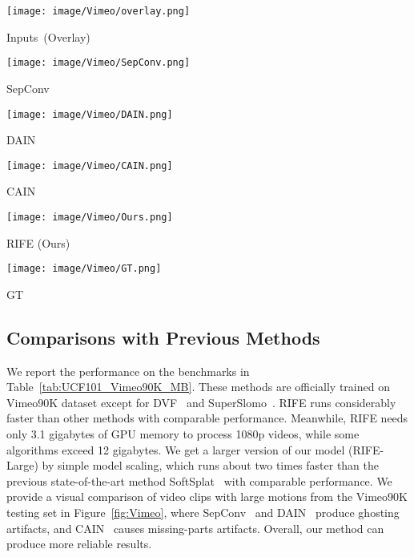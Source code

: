 \documentclass[10pt,twocolumn,letterpaper]{article}
\begin{document}
\begin{figure*}[htbp]
  \centering
  \begin{minipage}[t]{0.162\linewidth}
  \centering
  \texttt{[image: image/Vimeo/overlay.png]}
  \centerline{Inputs~(Overlay)}
  \end{minipage}
  \begin{minipage}[t]{0.162\linewidth}
  \centering
  \texttt{[image: image/Vimeo/SepConv.png]}
  \centerline{SepConv}
  \end{minipage}
\begin{minipage}[t]{0.162\linewidth}
  \centering
  \texttt{[image: image/Vimeo/DAIN.png]}
  \centerline{DAIN}
  \end{minipage}
  \begin{minipage}[t]{0.162\linewidth}
  \centering
  \texttt{[image: image/Vimeo/CAIN.png]}
  \centerline{CAIN}
  \end{minipage}
  \begin{minipage}[t]{0.162\textwidth}
  \centering
  \texttt{[image: image/Vimeo/Ours.png]}
  \centerline{RIFE (Ours)}
  \end{minipage}
  \begin{minipage}[t]{0.162\textwidth}
  \centering
  \texttt{[image: image/Vimeo/GT.png]}
  \centerline{GT}
  \end{minipage}
  \caption{\textbf{Qualitative comparison on Vimeo90K~\cite{xue2019video} testing set}. We cut out the objects according to the green boxes and zoom in the results~\cite{choi2020channel}. While other methods cause various artifacts, our method produces best effects on the moving objects.}
\label{fig:Vimeo}
\vspace{-1em}
\end{figure*} 
\subsection{Comparisons with Previous Methods}
\label{sec:comparison}


We report the performance on the benchmarks in Table~\ref{tab:UCF101_Vimeo90K_MB}. These methods are officially trained on Vimeo90K dataset except for DVF~\cite{liu2017video} and SuperSlomo~\cite{jiang2018super}. RIFE runs considerably faster than other methods with comparable performance. Meanwhile, RIFE needs only 3.1 gigabytes of GPU memory to process 1080p videos, while some algorithms exceed 12 gigabytes. We get a larger version of our model (RIFE-Large) by simple model scaling, which runs about two times faster than the previous state-of-the-art method SoftSplat~\cite{niklaus2020softmax} with comparable performance. We provide a visual comparison of video clips with large motions from the Vimeo90K testing set in Figure~\ref{fig:Vimeo}, where SepConv~\cite{Niklaus_ICCV_2017} and DAIN~\cite{bao2019depth} produce ghosting artifacts, and CAIN~\cite{choi2020channel} causes missing-parts artifacts. Overall, our method can produce more reliable results. 
\end{document}
